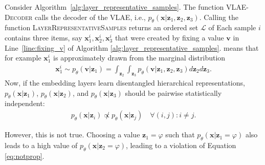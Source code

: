 Consider Algorithm~\ref{alg:layer_representative_samples}.
The function \textsc{VLAE-Decoder} calls the decoder of the \ac{VLAE}, i.e., $p_\theta(\bm{x} | \bm{z}_1, \bm{z}_2, \bm{z}_3)$.
Calling the function \textsc{LayerRepresentativeSamples} returns an ordered set $\mathcal{L}$ of 
Each sample $i$ contains three items, say $\bm{x}_1^i, \bm{x}_2^i, \bm{x}_3^i$ that were created by fixing a value $\bm{v}$ in Line~\ref{line:fixing_v} of Algorithm \ref{alg:layer_representative_samples}.
 means that for example $\bm{x}_1^i$ is approximately drawn from the marginal distribution
\begin{align}
    \bm{x}_1^i \sim p_\theta(\bm{v} | \bm{z}_1) = \int_{\bm{z}_2} \int_{\bm{z}_3} p_\theta(\bm{v} | \bm{z}_1, \bm{z}_2, \bm{z}_3) d\bm{z}_2 d\bm{z}_3.
\end{align}
Now, if the embedding layers learn disentangled hierarchical representations, $p_\theta(\bm{x} | \bm{z}_1)$, $p_\theta(\bm{x} | \bm{z}_2)$, and $p_\theta(\bm{x} | \bm{z}_3)$ should be pairwise statistically independent:
\begin{align}
    p_\theta(\bm{x} | \bm{z}_i) \not \propto p_\theta(\bm{x} | \bm{z}_j) \quad \forall (i,j):i\neq j. \label{eq:notprop}
\end{align}

However, this is not true.
Choosing a value $\bm{z}_1 = \varphi$ such that $p_\theta(\bm{x} | \bm{z}_1 = \varphi)$ also leads to a high value of $p_\theta(\bm{x} | \bm{z}_2 = \varphi)$, leading to a violation of Equation \ref{eq:notprop}.

